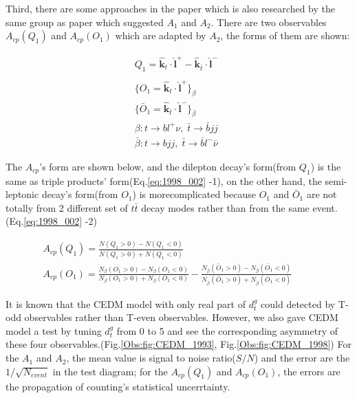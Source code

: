 
			Third, there are some approaches in the paper \cite{Bernreuther:1998qv} which is also researched by the same group as paper\cite{Bernreuther:1993hq} which suggested $A_1$ and $A_2$. There are two observables $A_{cp}(Q_1)$ and $A_{cp}(O_1)$ which are adapted by $A_2$, the forms of them are shown:

			\begin{equation}
			\begin{split} 
			Q_1 = \hat{\textbf{k}}_t \cdot \hat{\textbf{l}}^+ - \hat{\textbf{k}}_{\bar{t}} \cdot \hat{\textbf{l}}^- \;\\
			 \\
			\{ O_1 = \hat{\textbf{k}}_t \cdot \hat{\textbf{l}}^+ \}_{\beta} \;\;\;\;\;\;\;\;\;\;\\
			\{\bar{O}_1 = \hat{\textbf{k}}_{\bar{t}} \cdot \hat{\textbf{l}}^- \}_{\bar{\beta}} \;\;\;\;\;\;\;\;\;\;\\
			\beta : t\rightarrow bl^+\nu,\; \bar{t}\rightarrow \bar{b}jj \\
			\bar{\beta} : t\rightarrow bjj,\; \bar{t}\rightarrow \bar{b} l^- \bar{\nu} 
			\end{split}
			\label{eq:1998_001}
			\end{equation}

			The $A_{cp}$'s form are shown below, and the dilepton decay's form(from $Q_1$) is the same as triple products' form(Eq.\ref{eq:1998_002} -1), on the other hand, the semi-leptonic decay's form(from $O_1$) is morecomplicated because $O_1$ and $\bar{O}_1$ are not totally from 2 different set of $t\bar{t}$ decay modes rather than from the same event.(Eq.\ref{eq:1998_002} -2)

			\begin{equation}
			\begin{split} 
			A_{cp}(Q_1) = \frac{ N(Q_1 > 0) - N(Q_1 < 0) }{N(Q_1 > 0) + N(Q_1 < 0) } \;\;\;\;\;\;\;\;\;\;\;\;\;\;\;\;\;\;\;\;\;\;\;\;\;\;\;\;\;\;\;\;\;\;\;\;\;\;\;\;\;\;\;\;\;\;\;\;\;\\
			A_{cp}(O_1) = \frac{ N_{\beta}(O_1 > 0) - N_{\beta}(O_1 < 0) }{N_{\beta}(O_1 > 0) + N_{\beta}(O_1 < 0) } - \frac{ N_{\bar{\beta}}(\bar{O}_1 > 0) - N_{\bar{\beta}}(\bar{O}_1 < 0) }{N_{\bar{\beta}}(\bar{O}_1 > 0) + N_{\bar{\beta}}(\bar{O}_1 < 0) } 
			\end{split}
			\label{eq:1998_002}
			\end{equation}


			It is known that the CEDM model with only real part of $d_t^g$ could detected by T-odd observables rather than T-even observables. However, we also gave CEDM model a test by tuning $d_t^g$ from 0 to 5 and see the corresponding asymmetry of these four observables.(Fig.\ref{Obs:fig:CEDM_1993}, Fig.\ref{Obs:fig:CEDM_1998}) For the $A_1$ and $A_2$, the mean value is signal to noise ratio($S/N$) and the error are the $1/\sqrt{N_{event}}$ in the test diagram; for the $A_{cp}(Q_1)$ and $A_{cp}(O_1)$, the errors are the propagation of counting's statistical uncerrtainty.

